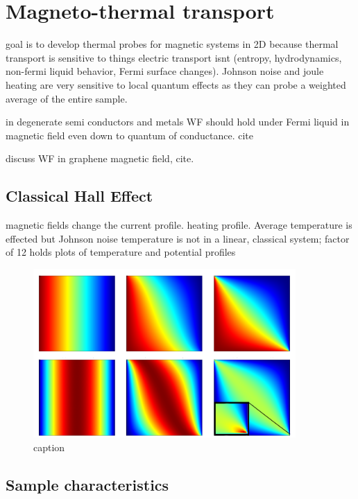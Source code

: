 

\chapter{Magneto-thermal transport}
\label{ch:magneto-thermal_transport}

goal is to develop thermal probes for magnetic systems in 2D because thermal transport is sensitive to things electric transport isnt (entropy, hydrodynamics, non-fermi liquid behavior, Fermi surface changes). Johnson noise and joule heating are very sensitive to local quantum effects as they can probe a weighted average of the entire sample.


in degenerate semi conductors and metals WF should hold under Fermi liquid in magnetic field even down to quantum of conductance. cite

discuss WF in graphene magnetic field, cite.

\section{Classical Hall Effect}
magnetic fields change the current profile. heating profile. 
Average temperature is effected but Johnson noise temperature is not
in a linear, classical system; factor of 12 holds
plots of temperature and potential profiles

\begin{figure}
\centering
\includegraphics[width=100mm]{figures/magneto/Hall_T_V.png}
\caption{caption}
\label{fig:m_Hall_profiles}
\end{figure}

\section{Sample characteristics}

